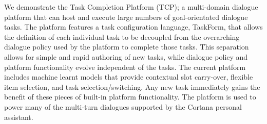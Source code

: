 We demonstrate the Task Completion Platform (TCP); a multi-domain dialogue platform that can host and execute large numbers of goal-orientated dialogue tasks. The platform features a task configuration language, TaskForm, that allows the definition of each individual task to be decoupled from the overarching dialogue policy used by the platform to complete those tasks. This separation allows for simple and rapid authoring of new tasks, while dialogue policy and platform functionality evolve independent of the tasks. The current platform includes machine learnt models that provide contextual slot carry-over, flexible item selection, and task selection/switching. Any new task immediately gains the benefit of these pieces of built-in platform functionality. The platform is used to power many of the multi-turn dialogues supported by the Cortana personal assistant.
